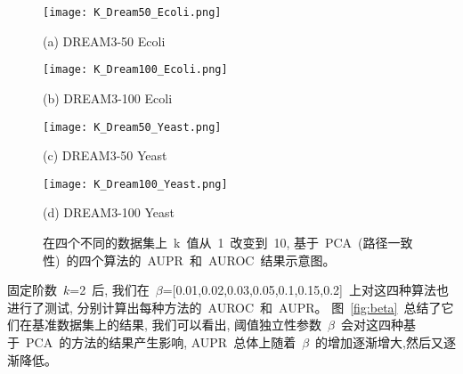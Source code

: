 \begin{figure*}[!htbp]
    \centering
    \begin{minipage}[b]{0.45\linewidth}
      \centering
      \centerline{
        \texttt{[image: K\_Dream50\_Ecoli.png]}}
      \centerline{(a) DREAM3-50 Ecoli}
      \medskip  
    \end{minipage}
    \begin{minipage}[b]{0.45\linewidth}
      \centering
      \centerline{
        \texttt{[image: K\_Dream100\_Ecoli.png]}}
      \centerline{(b) DREAM3-100 Ecoli}
      \medskip  
    \end{minipage}
      \begin{minipage}[b]{0.45\linewidth}
      \centering
      \centerline{
        \texttt{[image: K\_Dream50\_Yeast.png]}}
      \centerline{(c) DREAM3-50 Yeast}
      \medskip  
    \end{minipage}
    \begin{minipage}[b]{0.45\linewidth}
      \centering
      \centerline{
        \texttt{[image: K\_Dream100\_Yeast.png]}}
      \centerline{(d) DREAM3-100 Yeast}
      \medskip  
    \end{minipage}
    \caption{%
    在四个不同的数据集上~k~值从~1~改变到~10, 基于~PCA~(路径一致性)~的四个算法的~AUPR~和~AUROC~结果示意图。
    }
    \label{fig:k}
\end{figure*}

固定阶数~$k$=2~后, 我们在~$\beta$=[0.01,0.02,0.03,0.05,0.1,0.15,0.2]~上对这四种算法也进行了测试, 
分别计算出每种方法的~AUROC~和~AUPR。
图~\ref{fig:beta}~总结了它们在基准数据集上的结果, 
我们可以看出, 阈值独立性参数~$\beta$~会对这四种基于~PCA~的方法的结果产生影响,
AUPR~总体上随着~$\beta$~的增加逐渐增大,然后又逐渐降低。


